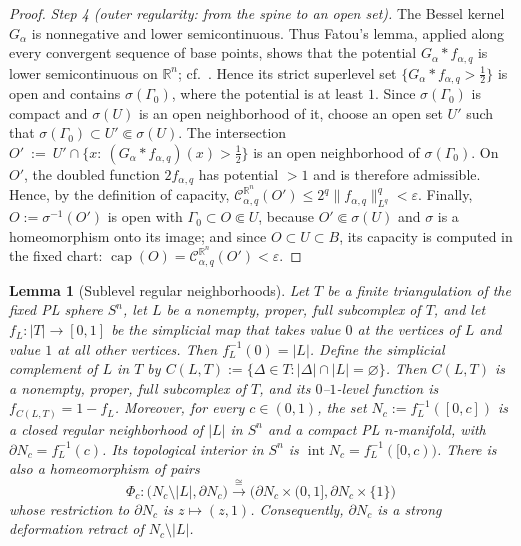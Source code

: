 \documentclass[12pt,oneside,a4paper]{article}
\theoremstyle{mytheorem}
\newtheorem{lemma}[definition]{Lemma}
\theoremstyle{remark}
\theoremstyle{definition}
\begin{document}
\begin{proof}
\smallskip\noindent\emph{Step 4 (outer regularity: from the spine to an open set).}
The Bessel kernel $G_\alpha$ is nonnegative and lower semicontinuous.
Thus Fatou's lemma, applied along every convergent sequence of base
points, shows that the potential $G_\alpha*f_{\alpha,q}$ is lower
semicontinuous on $\mathbb R^n$; cf.\
\cite[Proposition~2.3.2]{zbMATH00824833}.
Hence its strict superlevel set
$\{G_\alpha*f_{\alpha,q}>\tfrac12\}$ is open and contains
$\sigma(\Gamma_0)$, where the potential is at least $1$.  Since
$\sigma(\Gamma_0)$ is compact and $\sigma(U)$ is an open neighborhood
of it, choose an open set $U'$ such that
$\sigma(\Gamma_0)\subset U'\Subset\sigma(U)$.  The intersection
$O'\ :=\ U'\cap\bigl\{x:\ (G_\alpha*f_{\alpha,q})(x)>\tfrac12\bigr\}$ is an open
neighborhood of $\sigma(\Gamma_0)$. On $O'$, the doubled function
$2f_{\alpha,q}$ has potential $>1$ and is therefore admissible.  Hence,
by the definition of capacity,
\(\mathcal{C}_{\alpha,q}^{\mathbb R^n}(O')
\le 2^{q}\|f_{\alpha,q}\|_{L^q}^{q}<\varepsilon\).
Finally, $O:=\sigma^{-1}(O')$ is open with $\Gamma_0\subset O\Subset U$, because
$O'\Subset\sigma(U)$ and $\sigma$ is a homeomorphism onto its image; and since
$O\subset U\subset B$, its capacity is computed in the fixed chart:
$\operatorname{cap}(O)=\mathcal{C}_{\alpha,q}^{\mathbb R^n}(O')<\varepsilon$.
\end{proof}



\begin{lemma}[Sublevel regular neighborhoods]\label{lem:sublevel}
Let $T$ be a finite triangulation of the fixed PL sphere $S^n$, let $L$
be a nonempty, proper, full subcomplex of $T$, and let
$f_L:|T|\to[0,1]$ be the simplicial map that takes value $0$ at the
vertices of $L$ and value $1$ at all other vertices.  Then
$f_L^{-1}(0)=|L|$.  Define the simplicial complement of $L$ in $T$ by
$C(L,T):=\{\Delta\in T:|\Delta|\cap|L|=\varnothing\}$.
Then $C(L,T)$ is a nonempty, proper, full subcomplex of $T$, and its
$0$--$1$-level function is $f_{C(L,T)}=1-f_L$.  Moreover, for every
$c\in(0,1)$, the set $N_c:=f_L^{-1}([0,c])$
is a closed regular neighborhood of $|L|$ in $S^n$ and a compact PL
$n$-manifold, with $\partial N_c=f_L^{-1}(c)$.  Its topological
interior in $S^n$ is $\operatorname{int}N_c=f_L^{-1}([0,c))$.
There is also a homeomorphism of pairs
\begin{equation}\label{eq:punctured-sublevel-product}
 \Phi_c:
 \bigl(N_c\setminus|L|,\partial N_c\bigr)
 \xrightarrow{\ \cong\ }
 \bigl(\partial N_c\times(0,1],
       \partial N_c\times\{1\}\bigr)
\end{equation}
whose restriction to $\partial N_c$ is $z\mapsto(z,1)$.  Consequently,
$\partial N_c$ is a strong deformation retract of $N_c\setminus|L|$.
\end{lemma}
\end{document}
